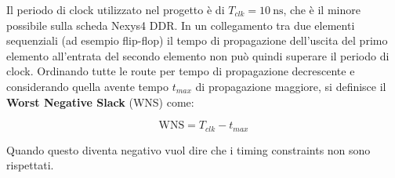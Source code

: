 Il periodo di clock utilizzato nel progetto è di 
$T_{clk} = \SI{10}{\nano\second}$, che è il minore possibile sulla scheda
Nexys4 DDR.
In un collegamento tra due elementi sequenziali (ad esempio flip-flop)
il tempo di propagazione dell'uscita del primo elemento all'entrata del
secondo elemento non può quindi superare il periodo di clock.
Ordinando tutte le route per tempo di propagazione decrescente e
considerando quella avente tempo $t_{max}$ di propagazione maggiore, si definisce
il \textbf{Worst Negative Slack} (WNS) come:

\[
\textrm{WNS} = T_{clk} - t_{max}
\] 

Quando questo diventa negativo vuol dire che i timing constraints non
sono rispettati. 
